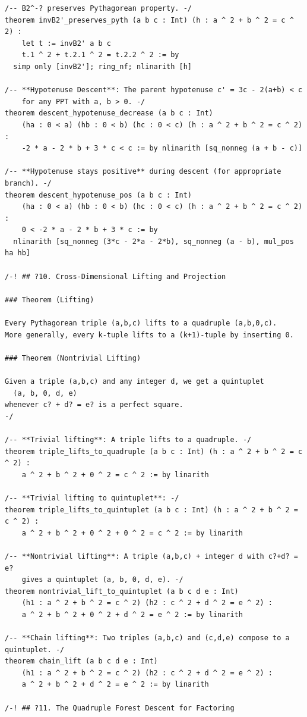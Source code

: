 \documentclass[11pt,twoside,openright]{book}
\theoremstyle{definition}
\theoremstyle{remark}
\begin{document}
\begin{lstlisting}[style=lean]
/-- B2^-? preserves Pythagorean property. -/
theorem invB2'_preserves_pyth (a b c : Int) (h : a ^ 2 + b ^ 2 = c ^ 2) :
    let t := invB2' a b c
    t.1 ^ 2 + t.2.1 ^ 2 = t.2.2 ^ 2 := by
  simp only [invB2']; ring_nf; nlinarith [h]

/-- **Hypotenuse Descent**: The parent hypotenuse c' = 3c - 2(a+b) < c
    for any PPT with a, b > 0. -/
theorem descent_hypotenuse_decrease (a b c : Int)
    (ha : 0 < a) (hb : 0 < b) (hc : 0 < c) (h : a ^ 2 + b ^ 2 = c ^ 2) :
    -2 * a - 2 * b + 3 * c < c := by nlinarith [sq_nonneg (a + b - c)]

/-- **Hypotenuse stays positive** during descent (for appropriate branch). -/
theorem descent_hypotenuse_pos (a b c : Int)
    (ha : 0 < a) (hb : 0 < b) (hc : 0 < c) (h : a ^ 2 + b ^ 2 = c ^ 2) :
    0 < -2 * a - 2 * b + 3 * c := by
  nlinarith [sq_nonneg (3*c - 2*a - 2*b), sq_nonneg (a - b), mul_pos ha hb]

/-! ## ?10. Cross-Dimensional Lifting and Projection

### Theorem (Lifting)

Every Pythagorean triple (a,b,c) lifts to a quadruple (a,b,0,c).
More generally, every k-tuple lifts to a (k+1)-tuple by inserting 0.

### Theorem (Nontrivial Lifting)

Given a triple (a,b,c) and any integer d, we get a quintuplet
  (a, b, 0, d, e)
whenever c? + d? = e? is a perfect square.
-/

/-- **Trivial lifting**: A triple lifts to a quadruple. -/
theorem triple_lifts_to_quadruple (a b c : Int) (h : a ^ 2 + b ^ 2 = c ^ 2) :
    a ^ 2 + b ^ 2 + 0 ^ 2 = c ^ 2 := by linarith

/-- **Trivial lifting to quintuplet**: -/
theorem triple_lifts_to_quintuplet (a b c : Int) (h : a ^ 2 + b ^ 2 = c ^ 2) :
    a ^ 2 + b ^ 2 + 0 ^ 2 + 0 ^ 2 = c ^ 2 := by linarith

/-- **Nontrivial lifting**: A triple (a,b,c) + integer d with c?+d? = e?
    gives a quintuplet (a, b, 0, d, e). -/
theorem nontrivial_lift_to_quintuplet (a b c d e : Int)
    (h1 : a ^ 2 + b ^ 2 = c ^ 2) (h2 : c ^ 2 + d ^ 2 = e ^ 2) :
    a ^ 2 + b ^ 2 + 0 ^ 2 + d ^ 2 = e ^ 2 := by linarith

/-- **Chain lifting**: Two triples (a,b,c) and (c,d,e) compose to a quintuplet. -/
theorem chain_lift (a b c d e : Int)
    (h1 : a ^ 2 + b ^ 2 = c ^ 2) (h2 : c ^ 2 + d ^ 2 = e ^ 2) :
    a ^ 2 + b ^ 2 + d ^ 2 = e ^ 2 := by linarith

/-! ## ?11. The Quadruple Forest Descent for Factoring


\end{lstlisting}
\end{document}
